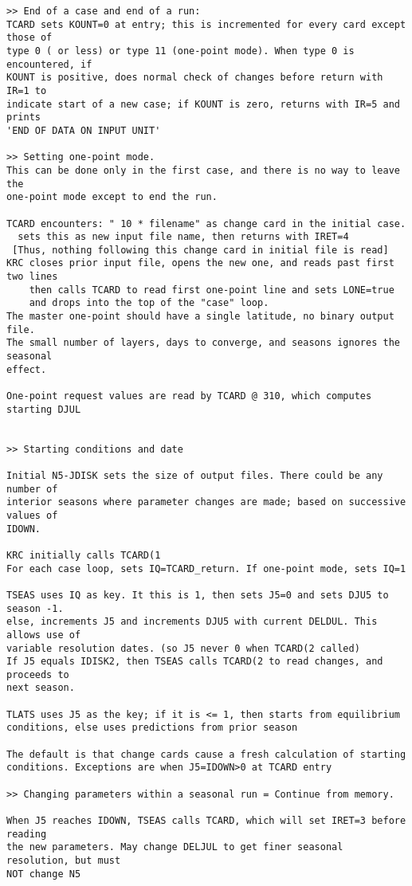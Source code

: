 \begin{verbatim}
>> End of a case and end of a run:
TCARD sets KOUNT=0 at entry; this is incremented for every card except those of
type 0 ( or less) or type 11 (one-point mode). When type 0 is encountered, if
KOUNT is positive, does normal check of changes before return with IR=1 to
indicate start of a new case; if KOUNT is zero, returns with IR=5 and prints
'END OF DATA ON INPUT UNIT'

>> Setting one-point mode.
This can be done only in the first case, and there is no way to leave the 
one-point mode except to end the run.

TCARD encounters: " 10 * filename" as change card in the initial case.
  sets this as new input file name, then returns with IRET=4 
 [Thus, nothing following this change card in initial file is read]
KRC closes prior input file, opens the new one, and reads past first two lines 
    then calls TCARD to read first one-point line and sets LONE=true
    and drops into the top of the "case" loop. 
The master one-point should have a single latitude, no binary output file.
The small number of layers, days to converge, and seasons ignores the seasonal 
effect.

One-point request values are read by TCARD @ 310, which computes starting DJUL
 

>> Starting conditions and date

Initial N5-JDISK sets the size of output files. There could be any number of
interior seasons where parameter changes are made; based on successive values of
IDOWN.

KRC initially calls TCARD(1
For each case loop, sets IQ=TCARD_return. If one-point mode, sets IQ=1

TSEAS uses IQ as key. It this is 1, then sets J5=0 and sets DJU5 to season -1.
else, increments J5 and increments DJU5 with current DELDUL. This allows use of
variable resolution dates. (so J5 never 0 when TCARD(2 called)
If J5 equals IDISK2, then TSEAS calls TCARD(2 to read changes, and proceeds to 
next season. 

TLATS uses J5 as the key; if it is <= 1, then starts from equilibrium
conditions, else uses predictions from prior season

The default is that change cards cause a fresh calculation of starting
conditions. Exceptions are when J5=IDOWN>0 at TCARD entry

>> Changing parameters within a seasonal run = Continue from memory.

When J5 reaches IDOWN, TSEAS calls TCARD, which will set IRET=3 before reading
the new parameters. May change DELJUL to get finer seasonal resolution, but must
NOT change N5


\end{verbatim}
